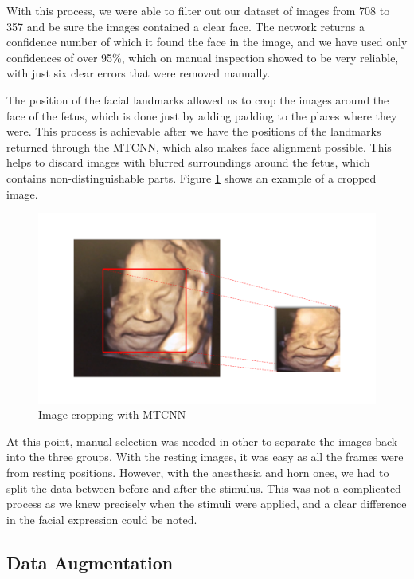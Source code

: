 With this process, we were able to filter out our dataset of images from 708 to 357 and be sure the images contained a clear face. The network returns a confidence number of which it found the face in the image, and we have used only confidences of over 95\%, which on manual inspection showed to be very reliable, with just six clear errors that were removed manually.

The position of the facial landmarks allowed us to crop the images around the face of the fetus, which is done just by adding padding to the places where they were. This process is achievable after we have the positions of the landmarks returned through the MTCNN, which also makes face alignment possible. This helps to discard images with blurred surroundings around the fetus, which contains non-distinguishable parts.  Figure \ref{fig:cropping} shows an example of a cropped image.

\begin{figure}[h!tp]
    \centering
    \includegraphics[width=.9\textwidth]{imgs/chap3_cropping.png}
    \caption{Image cropping with MTCNN}
    \label{fig:cropping}
\end{figure}

At this point, manual selection was needed in other to separate the images back into the three groups. With the resting images, it was easy as all the frames were from resting positions. However, with the anesthesia and horn ones, we had to split the data between before and after the stimulus. This was not a complicated process as we knew precisely when the stimuli were applied, and a clear difference in the facial expression could be noted.

\subsection{Data Augmentation}

